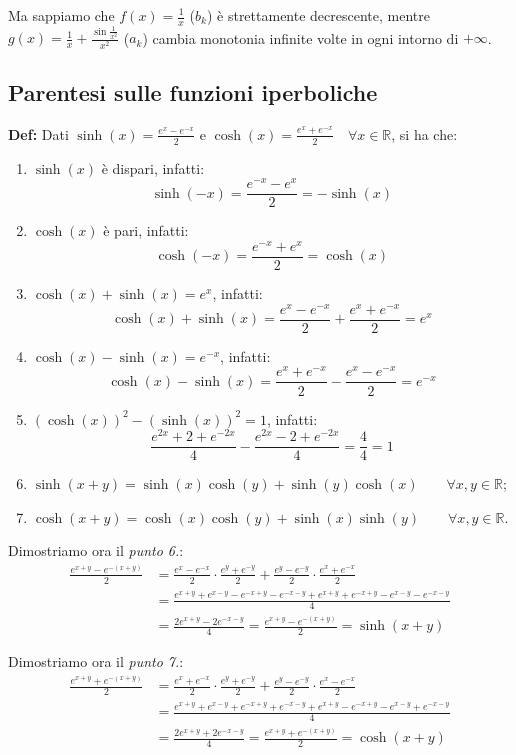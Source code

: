 \documentclass{article}
\begin{document}
\noindent Ma sappiamo che $f(x) = \frac{1}{x}$ ($b_k$) è strettamente decrescente, mentre $g(x) = \frac{1}{x} + \frac{\sin\frac{1}{x^2}}{x^2}$ ($a_k$) cambia monotonia infinite volte in ogni intorno di $+\infty$.

\subsection{Parentesi sulle funzioni iperboliche}
\textbf{Def:} Dati $\sinh(x) = \frac{e^x - e^{-x}}{2}$ e $\cosh(x) = \frac{e^x + e^{-x}}{2} \quad \forall x \in \mathbb{R}$, si ha che:
\begin{enumerate}
    \item $\sinh(x)$ è dispari, infatti: $$\sinh(-x) = \frac{e^{-x} - e^x}{2} = -\sinh(x)$$
    \item $\cosh(x)$ è pari, infatti: $$\cosh(-x) = \frac{e^{-x} + e^x}{2} = \cosh(x)$$
    \item $\cosh(x) + \sinh(x) = e^x$, infatti: $$\cosh(x) + \sinh(x) = \frac{e^x - e^{-x}}{2} + \frac{e^x + e^{-x}}{2} = e^x$$
    \item $\cosh(x) - \sinh(x) = e^{-x}$, infatti: $$\cosh(x) - \sinh(x) = \frac{e^x + e^{-x}}{2} - \frac{e^x - e^{-x}}{2} = e^{-x}$$ 
    \item $(\cosh(x))^2 - (\sinh(x))^2 = 1$, infatti: $$\frac{e^{2x} + 2 + e^{-2x}}{4} - \frac{e^{2x} - 2 + e^{-2x}}{4} = \frac{4}{4} = 1$$
    \item $\sinh(x + y) = \sinh(x)\cosh(y) + \sinh(y)\cosh(x) \qquad \forall x, y \in \mathbb{R}$;
    \item $\cosh(x + y) = \cosh(x)\cosh(y) + \sinh(x)\sinh(y) \qquad \forall x, y \in \mathbb{R}$.
\end{enumerate}

\noindent Dimostriamo ora il \textit{punto 6.}:
\begin{align*}
    \frac{e^{x + y} - e^{-(x + y)}}{2} &= \frac{e^x - e^{-x}}{2} \cdot \frac{e^y + e^{-y}}{2} + \frac{e^y - e^{-y}}{2} \cdot \frac{e^x + e^{-x}}{2} \\ 
    &= \frac{e^{x + y} + e^{x - y} - e^{-x + y} - e^{-x - y} + e^{x + y} + e^{-x + y} - e^{x - y} - e^{- x - y}}{4} \\
    &= \frac{2e^{x + y} - 2e^{-x - y}}{4} = \frac{e^{x + y} - e^{- (x + y)}}{2} = \sinh(x + y)
\end{align*}

\noindent Dimostriamo ora il \textit{punto 7.}:
\begin{align*}
    \frac{e^{x + y} + e^{- (x + y)}}{2} &= \frac{e^x + e^{-x}}{2} \cdot \frac{e^y + e^{-y}}{2} + \frac{e^y - e^{-y}}{2} \cdot \frac{e^x - e^{-x}}{2} \\
    &= \frac{e^{x + y} + e^{x - y} + e^{-x + y} + e^{-x - y} + e^{x + y} - e^{-x + y} - e^{x - y} + e^{- x - y}}{4} \\
    &= \frac{2e^{x + y} + 2e^{- x - y}}{4} = \frac{e^{x + y} + e^{- (x + y)}}{2} = \cosh(x + y)
\end{align*}
\end{document}
